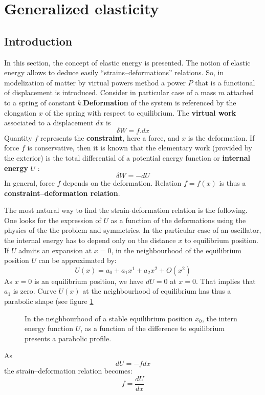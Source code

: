 \documentclass[12pt]{book}
\begin{document}
\section{Generalized elasticity}\label{secelastigene} 
\subsection{Introduction}
In this section, the concept of elastic energy is presented.
The notion of elastic energy allows to deduce easily ``strains--deformations''
relations. 
So, in modelization of matter by virtual powers method
a power $P$ that is a functional of displacement is introduced.
Consider in particular case of a mass $m$ attached to a spring of constant
$k$.{\bf Deformation} of the system is referenced by the elongation $x$ of the
spring with respect to equilibrium.
The {\bf virtual work}
associated to a displacement
$dx$ is 
\begin{equation}\label{deltWfdx}
\delta W=f.dx
\end{equation}
Quantity $f$ represents the {\bf constraint}, here a force, and
$x$ is the deformation. If force  $f$ is conservative, then it is known that
the elementary work (provided by the exterior) is the total differential of a
potential energy function or {\bf internal energy} $U$ :
\begin{equation}\label{eqdeltaWdU}
\delta W=-dU
\end{equation}
In general, force $f$ depends on the deformation. Relation $f=f(x)$ is thus a
{\bf constraint--deformation relation}.


The most natural way to find the strain-deformation relation is the
following. One looks for the expression of $U$ as a function of the
deformations using the physics of the the problem and symmetries. In the
particular case of an oscillator, the internal energy has to depend only on
the distance  $x$ to equilibrium position. If $U$ admits an expansion at
$x=0$, in the neighbourhood of the equilibrium position $U$ can be approximated
by:
\begin{equation}
U(x)=a_0+a_1x^1+a_2x^2+O(x^2)
\end{equation}
As $x=0$ is an equilibrium position, we have $dU=0$ at $x=0$. That implies that
$a_1$ is zero. Curve $U(x)$ at the neighbourhood of equilibrium has thus a
parabolic shape (see figure \ref{figparabe}
\begin{figure}[htb]
 \centerline{}   
 \caption{In the neighbourhood of a stable equilibrium position $x_0$, the
   intern energy function $U$, as a function of the difference to equilibrium
   presents a parabolic profile.}
 \label{figparabe}
\end{figure}
As
\begin{equation}
dU=-fdx
\end{equation}
the strain--deformation relation becomes:
\begin{equation}
f=\frac{dU}{dx}
\end{equation}
\end{document}
